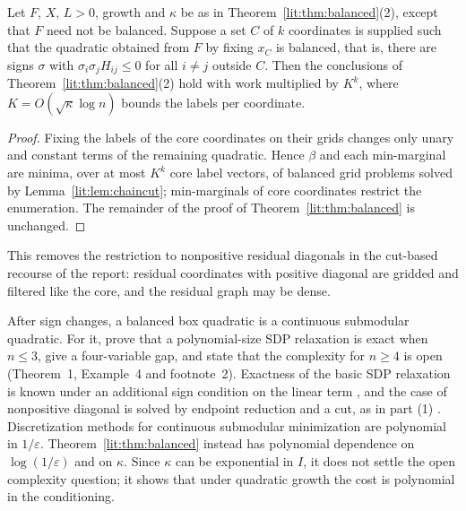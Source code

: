 \begin{corollary}\label{lit:cor:core}
Let $F$, $X$, $L>0$, growth and $\kappa$ be as in Theorem~\ref{lit:thm:balanced}(2), except that
$F$ need not be balanced. Suppose a set $C$ of $k$ coordinates is supplied such that the
quadratic obtained from $F$ by fixing $x_C$ is balanced, that is, there are signs $\sigma$ with
$\sigma_i\sigma_jH_{ij}\le0$ for all $i\neq j$ outside $C$. Then the conclusions of
Theorem~\ref{lit:thm:balanced}(2) hold with work multiplied by
$K^{k}$, where $K=O(\sqrt\kappa\log n)$ bounds the labels per coordinate.
\end{corollary}

\begin{proof}
Fixing the labels of the core coordinates on their grids changes only unary and constant terms of
the remaining quadratic. Hence $\beta$ and each min-marginal are minima, over at most $K^k$ core
label vectors, of balanced grid problems solved by Lemma~\ref{lit:lem:chaincut}; min-marginals of
core coordinates restrict the enumeration. The remainder of the proof of
Theorem~\ref{lit:thm:balanced} is unchanged.
\end{proof}

This removes the restriction to nonpositive residual diagonals in the cut-based recourse of the
report: residual coordinates with positive diagonal are gridded and filtered like the core, and
the residual graph may be dense.

\begin{remark}
After sign changes, a balanced box quadratic is a continuous submodular quadratic. For it,
\cite{BurerNatarajanWillemsen2026v3} prove that a polynomial-size SDP relaxation is exact when
$n\le3$, give a four-variable gap, and state that the complexity for $n\ge4$ is open
(Theorem~1, Example~4 and footnote~2). Exactness of the basic SDP relaxation is known under an
additional sign condition on the linear term \cite{KimKojima2003}, and the case of nonpositive
diagonal is solved by endpoint reduction and a cut, as in part (1)
\cite{BurerNatarajanWillemsen2026v3,Padberg1989}. Discretization methods for continuous
submodular minimization \cite{Bach2019,Bach2018Isotonic,AxelrodLiuSidford2020} are polynomial
in $1/\varepsilon$. Theorem~\ref{lit:thm:balanced} instead has polynomial dependence on
$\log(1/\varepsilon)$ and on $\kappa$. Since $\kappa$ can be exponential in $I$, it does not
settle the open complexity question; it shows that under quadratic growth the cost is
polynomial in the conditioning.
\end{remark}

